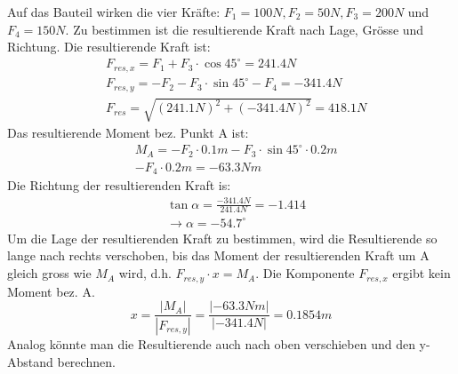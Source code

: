 \begin{bspbox}
    \begin{minipage}{.58\textwidth}
        Auf das Bauteil wirken die vier Kräfte:
        $F_1 = 100N, F_2 = 50N, F_3 = 200N$ und $F_4 = 150N$.
        Zu bestimmen ist die resultierende Kraft nach Lage, Grösse
        und Richtung.
        Die resultierende Kraft ist:
        \begin{equation*}
            \begin{split}
                &F_{res, x} = F_1 + F_3 \cdot \cos{45^{\circ}} = 241.4N \\
                &\displaystyle F_{res, y} = -F_2 - F_3 \cdot \sin{45^{\circ}} - F_4 = -341.4N \\
                &\displaystyle F_{res} = \sqrt{(241.1N)^2 + (-341.4N)^2} = 418.1N
            \end{split}
        \end{equation*}
        Das resultierende Moment bez. Punkt A ist:
        \begin{equation*}
            \begin{split}
                &M_A = -F_2 \cdot 0.1m - F_3 \cdot \sin{45^{\circ}} \cdot 0.2m \\
                &- F_4 \cdot 0.2m = -63.3Nm
            \end{split}
        \end{equation*}
        Die Richtung der resultierenden Kraft is:
        \begin{equation*}
            \begin{split}
                &\tan{\alpha} = \frac{-341.4N}{241.4N} = -1.414 \\
                &\rightarrow \alpha = -54.7^{\circ}
            \end{split}
        \end{equation*}
        Um die Lage der resultierenden Kraft zu bestimmen,
        wird die Resultierende so lange nach rechts
        verschoben, bis das Moment der resultierenden Kraft
        um A gleich gross wie $M_A$ wird, d.h. $F_{res, y} \cdot x = M_A$.
        Die Komponente $F_{res, x}$ ergibt kein Moment bez. A.
        \begin{equation*}
            x = \frac{|M_A|}{|F_{res, y}|} = \frac{|-63.3Nm|}{|-341.4N|} = 0.1854m
        \end{equation*}
        Analog könnte man die Resultierende auch nach oben
        verschieben und den y-Abstand berechnen.
    \end{minipage}
    \begin{minipage}{.4\textwidth}

\end{minipage}
\end{bspbox}
